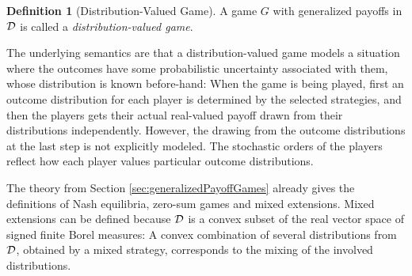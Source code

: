 \documentclass[a4paper]{scrreprt}
\theoremstyle{definition}
\newtheorem{defn}[thm]{Definition} %
\begin{document}
    \begin{defn}[Distribution-Valued Game]
        A game $G$ with generalized payoffs in $\mathcal{D}$ is called a \emph{distribution-valued game}.
        \label{def:distributionValuedGame}
    \end{defn}
    The underlying semantics are that a distribution-valued game models a situation where the outcomes have some probabilistic uncertainty associated with them, whose distribution is known before-hand: When the game is being played, first an outcome distribution for each player is determined by the selected strategies, and then the players gets their actual real-valued payoff drawn from their distributions independently.
    However, the drawing from the outcome distributions at the last step is not explicitly modeled. The stochastic orders of the players reflect how each player values particular outcome distributions.

    The theory from Section \ref{sec:generalizedPayoffGames} already gives the definitions of Nash equilibria, zero-sum games and mixed extensions. 
    Mixed extensions can be defined because $\mathcal{D}$ is a convex subset of the real vector space of signed finite Borel measures: A convex combination of several distributions from $\mathcal{D}$, obtained by a mixed strategy, corresponds to the mixing of the involved distributions.
    
\end{document}
